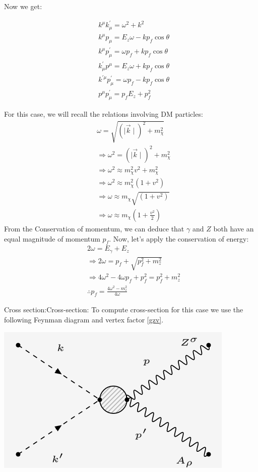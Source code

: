 \documentclass[12pt]{report}
\begin{document}
Now we get:

\begin{align*}
&k^\mu k^\prime_\mu = \omega^2+k^2\\
&k^\mu p_\mu = E_z \omega-kp_f \cos\theta\\
&k^\mu p^\prime_\mu = \omega p_f + kp_f \cos\theta\\
&k^\prime_\mu p^\mu = E_z \omega + kp_f \cos\theta\\
&k^{\prime\mu} p^\prime_\mu =  \omega p_f -kp_f \cos\theta\\
&p^\mu p^\prime_\mu = p_f E_z+p_f^2
\end{align*}


For this case, we will recall the relations involving DM particles: 
\begin{eqnarray}
&\omega = \sqrt{(\mid \vec{k} \mid)^2 + m_\chi^2}\\
&\Rightarrow \omega^2 =(\mid \vec{k} \mid)^2 + m_\chi^2\\
&\Rightarrow \omega^2 \approx m_\chi^2 v^2 + m_\chi^2\\
&\Rightarrow \omega^2 \approx m_\chi^2 (1+v^2)\\
&\Rightarrow \omega \approx m_\chi \sqrt{(1+v^2)}\\
&\Rightarrow \omega \approx m_\chi (1+\frac{v^2}{2})
\end{eqnarray}
From the Conservation of momentum, we can deduce that $\gamma$ and $Z$ both have an equal magnitude of momentum $p_f$. Now, let's apply the conservation of energy:
\begin{align}
& 2 \omega = E_\gamma+ E_z\\
&\Rightarrow 2 \omega = p_f+ \sqrt{p^2_f+ m^2_z}\\
&\Rightarrow 4 \omega^2 -4 \omega p_f + p^2_f = p^2_f +m^2_z\\
& \therefore p_f= \frac{4\omega^2 - m^2_z}{4 \omega}
\end{align}




\newpage



Cross section:Cross-section: To compute cross-section for this case we use the following Feynman diagram and vertex factor \ref{gzv}.

\begin{center}
\includegraphics[scale=0.5]{GW.png}
\end{center}
\end{document}
